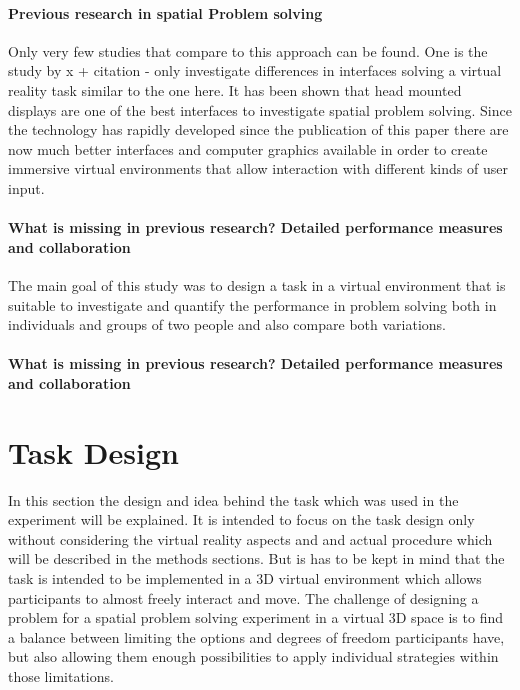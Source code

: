 \documentclass{article}
\begin{document}
\paragraph{Previous research in spatial Problem solving}
Only very few studies that compare to this approach can be found. One is the study by x + citation
- only investigate differences in interfaces solving a virtual reality task similar to the one here. It has been shown that head mounted displays are one of the best interfaces to investigate spatial problem solving. Since the technology has rapidly developed since the publication of this paper there are now much better interfaces and computer graphics available in order to create immersive virtual environments that allow interaction with different kinds of user input.
\paragraph{What is missing in previous research? Detailed performance measures and collaboration}
 The main goal of this study was to design a task in a virtual environment that is suitable to investigate and quantify the performance in problem solving both in individuals and groups of two people and also compare both variations. 

\paragraph{What is missing in previous research? Detailed performance measures and collaboration}

\section{Task Design}

In this section the design and idea behind the task which was used in the experiment will be explained. It is intended to focus on the task design only without considering the virtual reality aspects and and actual procedure which will be described in the methods sections. But is has to be kept in mind that the task is intended to be implemented in a 3D virtual environment which allows participants to almost freely interact and move. The challenge of designing a problem for a spatial problem solving experiment in a virtual 3D space is to find a balance between limiting the options and degrees of freedom participants have, but also allowing them enough possibilities to apply individual strategies within those limitations.
\end{document}
